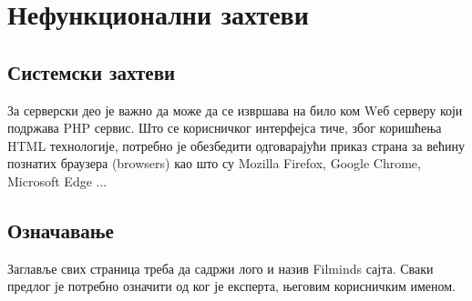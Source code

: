 \section{Нефункционални захтеви}
\subsection{Системски захтеви}
За серверски део је важно да може да се извршава на било ком Wеб серверу који подржава PHP сервис. Што се корисничког интерфејса тиче, због коришћења HTML технологије, потребно је обезбедити одговарајући приказ страна за већину познатих браузера (browsers) као што су Mozilla Firefox, Google Chrome, Microsoft Edge ...
\subsection{Означавање}
Заглавље свих страница треба да садржи лого и назив Filminds сајта. Сваки предлог је потребно означити од ког је експерта, његовим корисничким именом.

